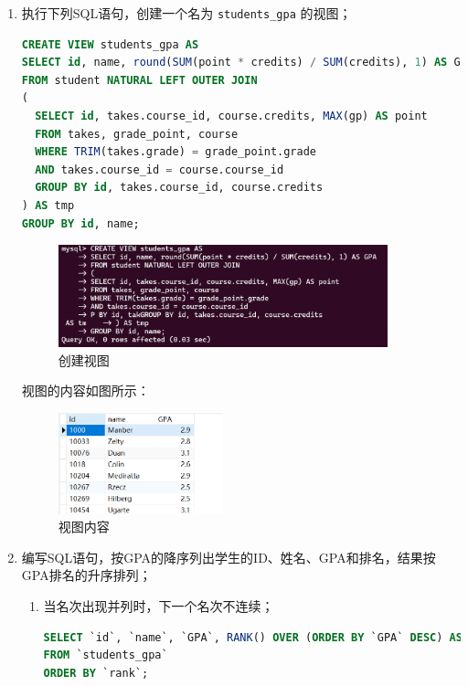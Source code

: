 \documentclass{article}
\renewcommand\tt{\texttt}
\begin{document}
\begin{enumerate}
\item 执行下列SQL语句，创建一个名为 \tt{students\_gpa} 的视图；

\begin{lstlisting}[language=sql]
CREATE VIEW students_gpa AS
SELECT id, name, round(SUM(point * credits) / SUM(credits), 1) AS GPA
FROM student NATURAL LEFT OUTER JOIN
(
  SELECT id, takes.course_id, course.credits, MAX(gp) AS point
  FROM takes, grade_point, course
  WHERE TRIM(takes.grade) = grade_point.grade 
  AND takes.course_id = course.course_id
  GROUP BY id, takes.course_id, course.credits
) AS tmp
GROUP BY id, name;
\end{lstlisting}

\begin{figure}[H]
  \centering
  \includegraphics[width=0.9\textwidth]{img/27.png}
  \caption{创建视图}
\end{figure}

视图的内容如图所示：

\begin{figure}[H]
  \centering
  \includegraphics[width=0.45\textwidth]{img/28.png}
  \caption{视图内容}
\end{figure}

\item 编写SQL语句，按GPA的降序列出学生的ID、姓名、GPA和排名，结果按GPA排名的升序排列；

\begin{enumerate}
  \item 当名次出现并列时，下一个名次不连续；
  \begin{lstlisting}[language=sql]
SELECT `id`, `name`, `GPA`, RANK() OVER (ORDER BY `GPA` DESC) AS `rank`
FROM `students_gpa`
ORDER BY `rank`;
  \end{lstlisting}


\end{enumerate}
\end{enumerate}
\end{document}
